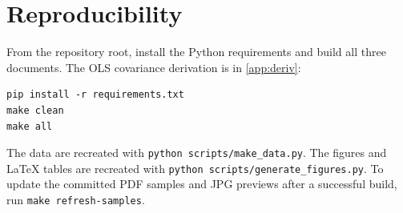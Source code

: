 \chapter{Reproducibility}\label{app:repro}

From the repository root, install the Python requirements and build all three documents. The OLS covariance derivation is in \cref{app:deriv}:
\begin{verbatim}
pip install -r requirements.txt
make clean
make all
\end{verbatim}
The data are recreated with \texttt{python scripts/make\_data.py}. The figures and LaTeX tables are recreated with \texttt{python scripts/generate\_figures.py}. To update the committed PDF samples and JPG previews after a successful build, run \texttt{make refresh-samples}.
